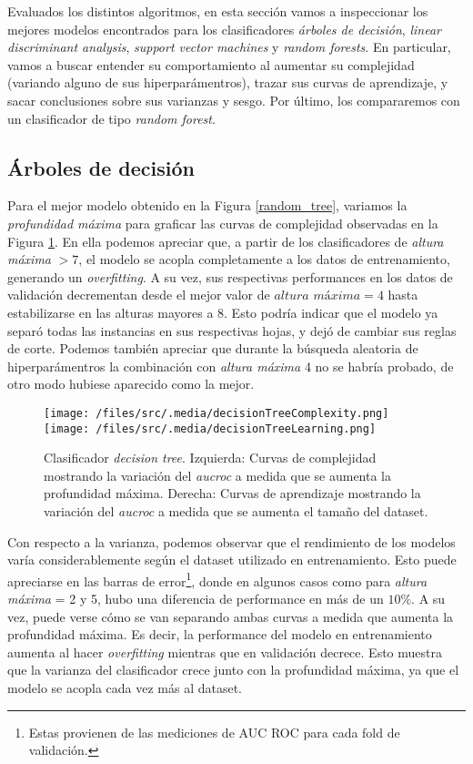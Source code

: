 Evaluados los distintos algoritmos, en esta sección vamos a inspeccionar los mejores modelos encontrados para los clasificadores \textit{árboles de decisión}, \textit{linear discriminant analysis}, \textit{support vector machines} y \textit{random forests}. En particular, vamos a buscar entender su comportamiento al aumentar su complejidad (variando alguno de sus hiperparámentros), trazar sus curvas de aprendizaje, y sacar conclusiones sobre sus varianzas y sesgo. Por último, los compararemos con un clasificador de tipo \textit{random forest}.

\subsection{Árboles de decisión}
Para el mejor modelo obtenido en la Figura \ref{random_tree}, variamos la \textit{profundidad máxima} para graficar las curvas de complejidad observadas en la Figura \ref{decisionTreeComplexity}. En ella podemos apreciar que, a partir de los clasificadores de \textit{altura máxima} $> 7$, el modelo se acopla completamente a los datos de entrenamiento, generando un \textit{overfitting}. A su vez, sus respectivas performances en los datos de validación decrementan desde el mejor valor de $\textit{altura máxima} = 4$ hasta estabilizarse en las alturas mayores a 8. Esto podría indicar que el modelo ya separó todas las instancias en sus respectivas hojas, y dejó de cambiar sus reglas de corte. Podemos también apreciar que durante la búsqueda aleatoria de hiperparámentros la combinación con \textit{altura máxima} 4 no se habría probado, de otro modo hubiese aparecido como la mejor.

\begin{figure}[!htbp]
    \centering
    \texttt{[image: /files/src/.media/decisionTreeComplexity.png]}
    \texttt{[image: /files/src/.media/decisionTreeLearning.png]}
    \caption{Clasificador \textit{decision tree}. Izquierda: Curvas de complejidad mostrando la variación del \textit{aucroc} a medida que se aumenta la profundidad máxima. Derecha: Curvas de aprendizaje mostrando la variación del \textit{aucroc} a medida que se aumenta el tamaño del dataset.}
    \label{decisionTreeComplexity}
\end{figure}

Con respecto a la varianza, podemos observar que el rendimiento de los modelos varía considerablemente según el dataset utilizado en entrenamiento. Esto puede apreciarse en las barras de error\footnote{Estas provienen de las mediciones de AUC ROC para cada fold de validación.}, donde en algunos casos como para \textit{altura máxima} = 2 y 5, hubo una diferencia de performance en más de un $10\%$. A su vez, puede verse cómo se van separando ambas curvas a medida que aumenta la profundidad máxima. Es decir, la performance del modelo en entrenamiento aumenta al hacer \textit{overfitting} mientras que en validación decrece. Esto muestra que la varianza del clasificador crece junto con la profundidad máxima, ya que el modelo se acopla cada vez más al dataset.

